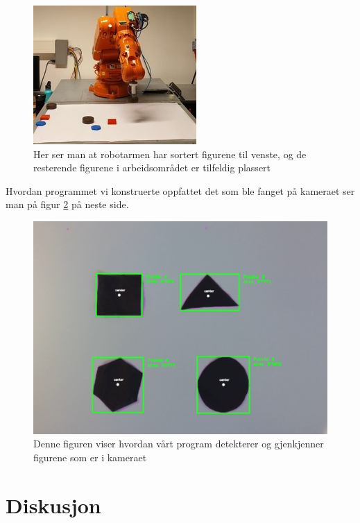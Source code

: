\documentclass[conference]{IEEEtran}
\begin{document}
    \begin{figure}
        \centering
        \includegraphics[width = .8\linewidth]{images/sortering.jpg}
        \caption{Her ser man at robotarmen har sortert figurene til venste, og de resterende figurene i arbeidsområdet er tilfeldig plassert}
        \label{resultat:sortering}
    \end{figure}

    Hvordan programmet vi konstruerte oppfattet det som ble fanget på kameraet ser man på figur \ref{resulatet:objekt} på neste side.
    \begin{figure}[!htb]
        \centering
        \includegraphics[width=.8\linewidth]{images/objektene.png}
        \caption{Denne figuren viser hvordan vårt program detekterer og gjenkjenner figurene som er i kameraet}
        \label{resulatet:objekt}
    \end{figure}

    
\section{Diskusjon}
\end{document}
